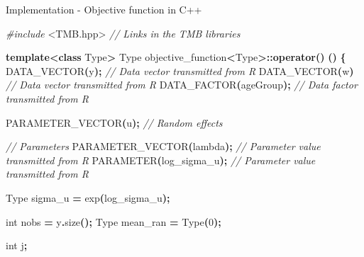 \documentclass[aspectratio=169]{beamer}
\newenvironment{Shaded}{\begin{snugshade}}{\end{snugshade}}
\newcommand{\CommentTok}[1]{\textcolor[rgb]{0.56,0.35,0.01}{\textit{#1}}}
\newcommand{\DataTypeTok}[1]{\textcolor[rgb]{0.13,0.29,0.53}{#1}}
\newcommand{\DecValTok}[1]{\textcolor[rgb]{0.00,0.00,0.81}{#1}}
\newcommand{\ImportTok}[1]{#1}
\newcommand{\KeywordTok}[1]{\textcolor[rgb]{0.13,0.29,0.53}{\textbf{#1}}}
\newcommand{\NormalTok}[1]{#1}
\newcommand{\OperatorTok}[1]{\textcolor[rgb]{0.81,0.36,0.00}{\textbf{#1}}}
\newcommand{\PreprocessorTok}[1]{\textcolor[rgb]{0.56,0.35,0.01}{\textit{#1}}}
\begin{document}
\begin{frame}[fragile]{Implementation - Objective function in C++}
\protect\hypertarget{implementation---objective-function-in-c}{}
\tiny

\begin{Shaded}
\begin{Highlighting}[]
\PreprocessorTok{\#include }\ImportTok{\textless{}TMB.hpp\textgreater{}}\PreprocessorTok{              }\CommentTok{// Links in the TMB libraries}

\KeywordTok{template}\OperatorTok{\textless{}}\KeywordTok{class}\NormalTok{ Type}\OperatorTok{\textgreater{}}
\NormalTok{Type objective\_function}\OperatorTok{\textless{}}\NormalTok{Type}\OperatorTok{\textgreater{}::}\KeywordTok{operator}\OperatorTok{()} \OperatorTok{()}
\OperatorTok{\{}
\NormalTok{  DATA\_VECTOR}\OperatorTok{(}\NormalTok{y}\OperatorTok{);}                       \CommentTok{// Data vector transmitted from R}
\NormalTok{  DATA\_VECTOR}\OperatorTok{(}\NormalTok{w}\OperatorTok{)}                \CommentTok{// Data vector transmitted from R}
\NormalTok{  DATA\_FACTOR}\OperatorTok{(}\NormalTok{ageGroup}\OperatorTok{);}        \CommentTok{// Data factor transmitted from R}

\NormalTok{  PARAMETER\_VECTOR}\OperatorTok{(}\NormalTok{u}\OperatorTok{);}              \CommentTok{// Random effects}
   
  \CommentTok{// Parameters}
\NormalTok{  PARAMETER\_VECTOR}\OperatorTok{(}\NormalTok{lambda}\OperatorTok{);}       \CommentTok{// Parameter value transmitted from R}
\NormalTok{  PARAMETER}\OperatorTok{(}\NormalTok{log\_sigma\_u}\OperatorTok{);}               \CommentTok{// Parameter value transmitted from R}
  
\NormalTok{  Type sigma\_u }\OperatorTok{=}\NormalTok{ exp}\OperatorTok{(}\NormalTok{log\_sigma\_u}\OperatorTok{);}

  \DataTypeTok{int}\NormalTok{ nobs }\OperatorTok{=}\NormalTok{ y}\OperatorTok{.}\NormalTok{size}\OperatorTok{();}
\NormalTok{  Type mean\_ran }\OperatorTok{=}\NormalTok{ Type}\OperatorTok{(}\DecValTok{0}\OperatorTok{);}
  
  \DataTypeTok{int}\NormalTok{ j}\OperatorTok{;}


\end{Highlighting}
\end{Shaded}
\end{frame}
\end{document}
